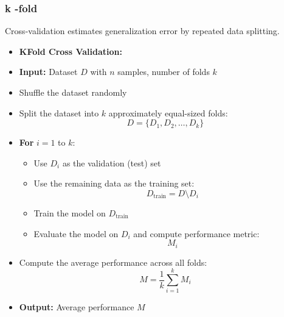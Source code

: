 \documentclass[10pt,a4paper]{article}
\begin{document}
	\subsubsection{k -fold}
	Cross-validation estimates generalization error by repeated data splitting.
	\begin{itemize}
		\item \textbf{KFold Cross Validation:}
		\item \textbf{Input:} Dataset $D$ with $n$ samples, number of folds $k$

		\item Shuffle the dataset randomly

		\item Split the dataset into $k$ approximately equal-sized folds:
		\[
		D = \{D_1, D_2, \dots, D_k\}
		\]

		\item \textbf{For} $i = 1$ to $k$:
		\begin{itemize}
			\item Use $D_i$ as the validation (test) set
			\item Use the remaining data as the training set:
			\[
			D_{\text{train}} = D \setminus D_i
			\]

			\item Train the model on $D_{\text{train}}$

			\item Evaluate the model on $D_i$ and compute performance metric:
			\[
			M_i
			\]
		\end{itemize}

		\item Compute the average performance across all folds:
		\[
		M = \frac{1}{k} \sum_{i=1}^{k} M_i
		\]

		\item \textbf{Output:} Average performance $M$
	\end{itemize}
\end{document}
